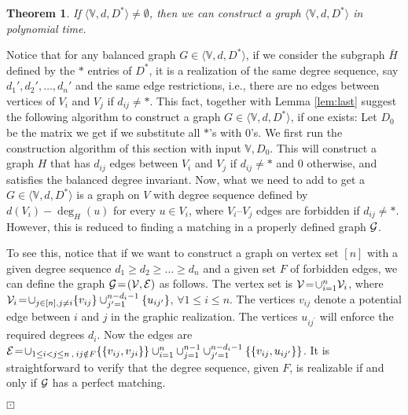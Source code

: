 \documentclass[12pt,a4paper]{article}
\theoremstyle{definition}
\theoremstyle{plain}
\newtheorem{thm}[dfn]{Theorem}
\newenvironment{prf}{\noindent {\bf Proof.}}{\begin{flushright}\vspace{-2em}\footnotesize$\boxdot$\normalsize\end{flushright}\smallskip}
\begin{document}
\begin{thm}\label{thm:*gener}
If $\langle \mathbb V, d, D^*\rangle\neq \emptyset$, then we can construct a graph $\langle \mathbb V, d, D^*\rangle$
in polynomial time.
\end{thm}
\begin{prf} Notice that for any balanced graph $G\in \langle \mathbb V, d, D^*\rangle$,
if we consider the subgraph $\bar{H}$ defined by the $*$ entries of
$D^*$, it is a realization
of the same degree sequence, 
say $d_1',d_2',\ldots,d_n'$ and the same
edge restrictions, i.e.,
there are no edges between vertices of $V_i$ and $V_j$ if $d_{ij}\neq *$.
This fact, together with Lemma \ref{lem:last} suggest the following algorithm
to construct a graph $G\in\langle \mathbb V, d, D^*\rangle$, if one exists:
Let $D_0$ be the matrix we get if we substitute all $*$'s with 0's.
We first run the construction algorithm of this section 
with input $\mathbb V, D_0$.
This will construct a graph $H$ that has $d_{ij}$ edges between
$V_i$ and $V_j$ if $d_{ij}\neq *$ and 0 otherwise, and satisfies the
balanced degree invariant.
Now, what we need to add to get a $G\in\langle \mathbb V, d, D^*\rangle$
is a graph on $V$ with degree sequence defined by $d(V_i)-\deg_H(u)$
for every $u\in V_i$, where $V_i$--$V_j$ edges are forbidden if $d_{ij}\neq *$.
However, this is reduced to finding a matching in a properly defined graph 
$\cal G$. 

To see this, notice that if we want to construct a graph on vertex set
$[n]$ with a given 
degree sequence $d_1 \geq d_2 \geq \ldots \geq d_n$ and a given set $F$ of forbidden edges,
we can define the graph ${\cal G}\! = \! ({\cal V},{\cal E})$
as follows.
The vertex set is ${\cal V} \! = \! \cup_{i=1}^n {\cal V}_i$,
where ${\cal V}_i \! = \! \cup_{j\in [n], j\neq i} \{ v_{ij} \}
                   \cup_{j^{\prime}=1}^{n-d_i-1} \{ u_{ij^{\prime}} \}$,
              $\forall 1 \leq i \leq n$.
The vertices $v_{ij}$ denote a potential
edge between $i$ and $j$ in the graphic realization.
The vertices $u_{ij^{\prime}}$ will enforce the required degrees $d_i$.
Now the edges are
${\cal E} \! = \! \cup_{1 \leq i < j \leq n\:, \:ij\notin F} \{ \{ v_{ij},v_{ji} \} \}
\cup_{i=1}^n \cup_{j=1}^{n-1}
        \cup_{j^{\prime}=1}^{n-d_i-1} \{ \{ v_{ij} , u_{ij^{\prime}} \} \}$.
It is straightforward to verify that
the degree sequence, given $F$, is realizable
if and only if  ${\cal G}$
has a perfect matching.
\end{prf}
\end{document}
